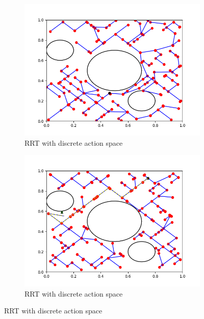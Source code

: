 \documentclass{article}
\begin{document}
\begin{enumerate}[(a)]
\begin{figure}[h!]
    \centering
    \begin{subfigure}{0.45\textwidth}
        \centering
        \includegraphics[width=\textwidth]{../figures/rrt_nh_run1.png}
        \caption{RRT with discrete action space}
    \end{subfigure}
    \hspace{0.2in}
    \begin{subfigure}{0.45\textwidth}
        \centering
        \includegraphics[width=\textwidth]{../figures/rrt_nh_run2.png}
        \caption{RRT with discrete action space}
    \end{subfigure}
\end{figure}


\end{enumerate}
\end{document}
